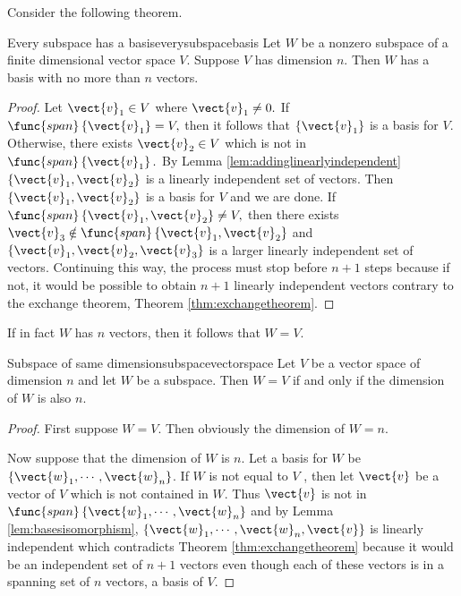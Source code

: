 Consider the following theorem. 

\begin{theorem}{Every subspace has a basis}{everysubspacebasis}
Let $W$ be a nonzero subspace of a finite dimensional vector
space $V$. Suppose $V$ has dimension $n$.
Then $W$ has a basis
with no more than $n$ vectors.
\end{theorem}

\begin{proof}
Let $\vect{v}_{1}\in V$ where $\vect{v}_{1}\neq 0.$ If $
\func{span}\left\{ \vect{v}_{1}\right\} =V,$ then it follows that $\left\{ \vect{v}
_{1}\right\} $ is a basis for $V$. Otherwise, there exists $\vect{v}
_{2}\in V$ which is not in $\func{span}\left\{ \vect{v}_{1}\right\} .$ By
Lemma \ref{lem:addinglinearlyindependent} $\left\{ \vect{v}_{1},\vect{v}_{2}\right\} $ is a
linearly independent set of vectors. Then $\left\{ \vect{v}_{1},\vect{v}
_{2}\right\} $ is a basis for $V$ and we are done. If $\func{span}\left\{ \vect{v}_{1},
\vect{v}_{2}\right\} \neq V,$ then there exists $\vect{v}_{3}\notin \func{
span}\left\{ \vect{v}_{1},\vect{v}_{2}\right\} $ and $\left\{ \vect{v}
_{1},\vect{v}_{2},\vect{v}_{3}\right\} $ is a larger linearly
independent set of vectors. Continuing this way, the process must stop
before $n+1$ steps because if not, it would be possible to obtain $n+1$
linearly independent vectors contrary to the exchange theorem, Theorem \ref{thm:exchangetheorem}. 
\end{proof}

If in fact $W$ has $n$ vectors, then it follows that $W=V$. 

\begin{theorem}{Subspace of same dimension}{subspacevectorspace}
Let $V$ be a vector space of dimension $n$ and let $W$ be a
subspace. Then $W=V$ if and only if the dimension of $W$ is also $n$.
\end{theorem}

\begin{proof}First suppose $W=V.$ Then obviously the dimension of $W=n.$

Now suppose that the dimension of $W$ is $n$. Let a basis for $W$ be $
\left\{ \vect{w}_{1},\cdots ,\vect{w}_{n}\right\} $. If $W$ is not equal to $V$
, then let $\vect{v}$ be a vector of $V$ which is not contained in $W.$ Thus $
\vect{v}$ is not in $\func{span}\left\{ \vect{w}_{1},\cdots ,\vect{w}
_{n}\right\} $ and by Lemma \ref{lem:basesisomorphism}, $\left\{ \vect{w}_{1},\cdots ,\vect{w}_{n},\vect{v}\right\} $ is linearly independent which contradicts
Theorem \ref{thm:exchangetheorem} because it would be an independent set of $n+1$
vectors even though each of these vectors is in a spanning set of $n$
vectors, a basis of $V$. 
\end{proof}


